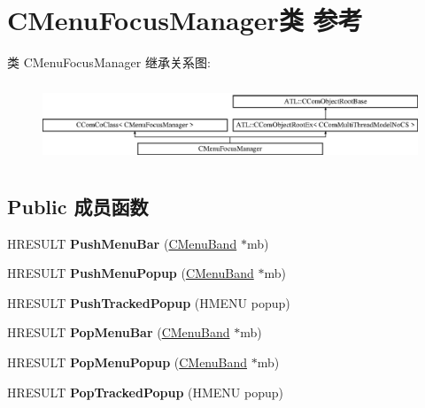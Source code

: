 \hypertarget{class_c_menu_focus_manager}{}\section{C\+Menu\+Focus\+Manager类 参考}
\label{class_c_menu_focus_manager}
类 C\+Menu\+Focus\+Manager 继承关系图\+:\begin{figure}[H]
\begin{center}
\leavevmode
\includegraphics[height=2.386364cm]{class_c_menu_focus_manager}
\end{center}
\end{figure}
\subsection*{Public 成员函数}
\begin{DoxyCompactItemize}
\item 
\mbox{\label{class_c_menu_focus_manager_ae8b0bc20ba436bb82b65a6cbd7787deb}} 
H\+R\+E\+S\+U\+LT {\bfseries Push\+Menu\+Bar} (\hyperlink{class_c_menu_band}{C\+Menu\+Band} $\ast$mb)
\item 
\mbox{\label{class_c_menu_focus_manager_a97aaaf084d78772cf182974e9b673fcc}} 
H\+R\+E\+S\+U\+LT {\bfseries Push\+Menu\+Popup} (\hyperlink{class_c_menu_band}{C\+Menu\+Band} $\ast$mb)
\item 
\mbox{\label{class_c_menu_focus_manager_a859722f8639279bb5d77b7710d3bc857}} 
H\+R\+E\+S\+U\+LT {\bfseries Push\+Tracked\+Popup} (H\+M\+E\+NU popup)
\item 
\mbox{\label{class_c_menu_focus_manager_abb6cba50a3c3dd757e7c34f45298ae96}} 
H\+R\+E\+S\+U\+LT {\bfseries Pop\+Menu\+Bar} (\hyperlink{class_c_menu_band}{C\+Menu\+Band} $\ast$mb)
\item 
\mbox{\label{class_c_menu_focus_manager_a347a3f8c5765a816862e793e2be0b0b3}} 
H\+R\+E\+S\+U\+LT {\bfseries Pop\+Menu\+Popup} (\hyperlink{class_c_menu_band}{C\+Menu\+Band} $\ast$mb)
\item 
\mbox{\label{class_c_menu_focus_manager_ab714efad13177097e6ba78f2f3eb6cfd}} 
H\+R\+E\+S\+U\+LT {\bfseries Pop\+Tracked\+Popup} (H\+M\+E\+NU popup)
\end{DoxyCompactItemize}
